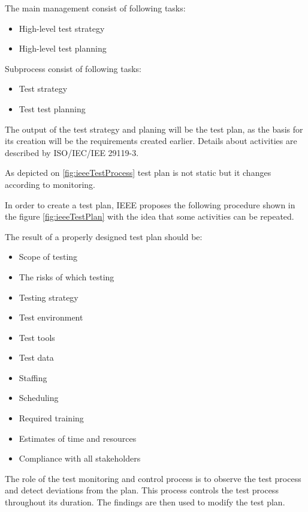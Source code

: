 The main management consist of following tasks:
\begin{itemize}
  \item High-level test strategy
  \item High-level test planning
\end{itemize}

Subprocess consist of following tasks:
\begin{itemize}
  \item Test strategy
  \item Test test planning
\end{itemize}

The output of the test strategy and planing will be the test plan, as the basis for its creation will be the requirements created earlier. Details about activities are described by ISO/IEC/IEE 29119-3.

As depicted on \ref{fig:ieeeTestProcess} test plan is not static but it changes according to monitoring.


In order to create a test plan, IEEE proposes the following procedure shown in the figure \ref{fig:ieeeTestPlan} with the idea that some activities can be repeated.

The result of a properly designed test plan should be:
\begin{itemize}
  \item Scope of testing
  \item The risks of which testing
  \item Testing strategy
  \item Test environment
  \item Test tools
  \item Test data
  \item Staffing
  \item Scheduling
  \item Required training
  \item Estimates of time and resources
  \item Compliance with all stakeholders
\end{itemize}

The role of the test monitoring and control process is to observe the test process and detect deviations from the plan. This process controls the test process throughout its duration. The findings are then used to modify the test plan.

